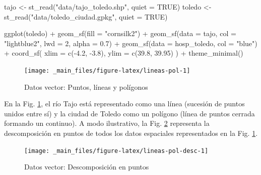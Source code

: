 \documentclass[
]{report}
\newenvironment{Shaded}{\begin{snugshade}}{\end{snugshade}}
\newcommand{\AttributeTok}[1]{\textcolor[rgb]{0.77,0.63,0.00}{#1}}
\newcommand{\ConstantTok}[1]{\textcolor[rgb]{0.00,0.00,0.00}{#1}}
\newcommand{\DecValTok}[1]{\textcolor[rgb]{0.00,0.00,0.81}{#1}}
\newcommand{\FloatTok}[1]{\textcolor[rgb]{0.00,0.00,0.81}{#1}}
\newcommand{\FunctionTok}[1]{\textcolor[rgb]{0.00,0.00,0.00}{#1}}
\newcommand{\NormalTok}[1]{#1}
\newcommand{\OtherTok}[1]{\textcolor[rgb]{0.56,0.35,0.01}{#1}}
\newcommand{\SpecialCharTok}[1]{\textcolor[rgb]{0.00,0.00,0.00}{#1}}
\newcommand{\StringTok}[1]{\textcolor[rgb]{0.31,0.60,0.02}{#1}}
\begin{document}
\begin{Shaded}
\begin{Highlighting}[]

\NormalTok{tajo }\OtherTok{\textless{}{-}} \FunctionTok{st\_read}\NormalTok{(}\StringTok{"data/tajo\_toledo.shp"}\NormalTok{, }\AttributeTok{quiet =} \ConstantTok{TRUE}\NormalTok{)}
\NormalTok{toledo }\OtherTok{\textless{}{-}} \FunctionTok{st\_read}\NormalTok{(}\StringTok{"data/toledo\_ciudad.gpkg"}\NormalTok{, }\AttributeTok{quiet =} \ConstantTok{TRUE}\NormalTok{)}


\FunctionTok{ggplot}\NormalTok{(toledo) }\SpecialCharTok{+}
  \FunctionTok{geom\_sf}\NormalTok{(}\AttributeTok{fill =} \StringTok{"cornsilk2"}\NormalTok{) }\SpecialCharTok{+}
  \FunctionTok{geom\_sf}\NormalTok{(}\AttributeTok{data =}\NormalTok{ tajo, }\AttributeTok{col =} \StringTok{"lightblue2"}\NormalTok{, }\AttributeTok{lwd =} \DecValTok{2}\NormalTok{, }\AttributeTok{alpha =} \FloatTok{0.7}\NormalTok{) }\SpecialCharTok{+}
  \FunctionTok{geom\_sf}\NormalTok{(}\AttributeTok{data =}\NormalTok{ hosp\_toledo, }\AttributeTok{col =} \StringTok{"blue"}\NormalTok{) }\SpecialCharTok{+}
  \FunctionTok{coord\_sf}\NormalTok{(}
    \AttributeTok{xlim =} \FunctionTok{c}\NormalTok{(}\SpecialCharTok{{-}}\FloatTok{4.2}\NormalTok{, }\SpecialCharTok{{-}}\FloatTok{3.8}\NormalTok{),}
    \AttributeTok{ylim =} \FunctionTok{c}\NormalTok{(}\FloatTok{39.8}\NormalTok{, }\FloatTok{39.95}\NormalTok{)}
\NormalTok{  ) }\SpecialCharTok{+}
  \FunctionTok{theme\_minimal}\NormalTok{()}
\end{Highlighting}
\end{Shaded}

\begin{figure}

{\centering \texttt{[image: \_main\_files/figure-latex/lineas-pol-1]} 

}

\caption{Datos vector: Puntos, líneas y polígonos}\label{fig:lineas-pol}
\end{figure}

En la Fig. \ref{fig:lineas-pol}, el río Tajo está representado como una línea
(sucesión de puntos unidos entre sí) y la ciudad de Toledo como un polígono
(línea de puntos cerrada formando un continuo). A modo ilustrativo, la Fig.
\ref{fig:lineas-pol-desc} representa la descomposición en puntos de todos los
datos espaciales representados en la Fig. \ref{fig:lineas-pol}.

\begin{figure}

{\centering \texttt{[image: \_main\_files/figure-latex/lineas-pol-desc-1]} 

}

\caption{Datos vector: Descomposición en puntos}\label{fig:lineas-pol-desc}
\end{figure}
\end{document}
